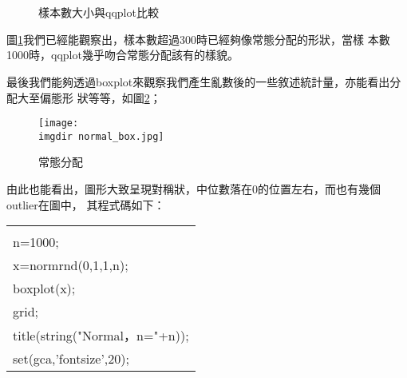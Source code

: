 \begin{enumerate}
{			\begin{figure}[H]
    		 	\centering
       			 \\
       			 \\
       			 \caption{樣本數大小與qqplot比較}
   				 \label{normal_qqplot}
			\end{figure}
			圖\ref{normal_qqplot}我們已經能觀察出，樣本數超過300時已經夠像常態分配的形狀，當樣				本數1000時，qqplot幾乎吻合常態分配該有的樣貌。
			
			最後我們能夠透過boxplot來觀察我們產生亂數後的一些敘述統計量，亦能看出分配大至偏態形				狀等等，如圖\ref{normal_box}；
			\begin{figure}[H]	
		 		 \centering	 			 	 
   				 \texttt{[image: \\imgdir normal\_box.jpg]} 
   			 	 \caption{常態分配}   		
   			 	 \label{normal_box}   			 		 
			\end{figure}
			由此也能看出，圖形大致呈現對稱狀，中位數落在$0$的位置左右，而也有幾個outlier在圖中，				其程式碼如下：
			\bigskip
			\begin{center}\colorbox{slight}{
				\begin{tabular}{p{}}
					\MJHmarker{\textbf{\color{darkblue}{MATLAB語法 :}}}\\		
					n=1000;\\
					x=normrnd(0,1,1,n);\\
					boxplot(x);\\
					grid;\\
					title(string("Normal，n="+n));  \\ 
					set(gca,'fontsize',20);\\
				\end{tabular}
			}
			\end{center}			
		}
		

\end{enumerate}
